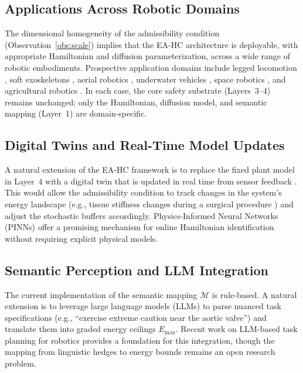\documentclass[11pt]{article}
\begin{document}
\subsection{Applications Across Robotic Domains}

The dimensional homogeneity of the admissibility condition (Observation~\ref{obs:scale})
implies that the EA-HC architecture is deployable, with appropriate Hamiltonian and diffusion
parameterization, across a wide range of robotic embodiments. Prospective application domains
include legged locomotion \cite{hutter2016}, soft exoskeletons \cite{menguc2013}, aerial
robotics \cite{faessler2018}, underwater vehicles \cite{fossen1994}, space robotics
\cite{flores2014}, and agricultural robotics \cite{bac2014}. In each case, the core safety
substrate (Layers~3--4) remains unchanged; only the Hamiltonian, diffusion model, and
semantic mapping (Layer~1) are domain-specific.

\subsection{Digital Twins and Real-Time Model Updates}

A natural extension of the EA-HC framework is to replace the fixed plant model in Layer~4
with a digital twin that is updated in real time from sensor feedback \cite{grieves2017,tao2019}.
This would allow the admissibility condition to track changes in the system's energy landscape
(e.g., tissue stiffness changes during a surgical procedure \cite{haddadin2017}) and adjust the
stochastic buffers accordingly. Physics-Informed Neural Networks (PINNs) \cite{raissi2019}
offer a promising mechanism for online Hamiltonian identification without requiring explicit
physical models.

\subsection{Semantic Perception and LLM Integration}
\label{sec:llm}

The current implementation of the semantic mapping $\mathcal{M}$ is rule-based. A natural
extension is to leverage large language models (LLMs) to parse nuanced task specifications
(e.g., ``exercise extreme caution near the aortic valve'') and translate them into graded
energy ceilings $E_{\max}$. Recent work on LLM-based task planning for robotics \cite{ahn2023}
provides a foundation for this integration, though the mapping from linguistic hedges to energy
bounds remains an open research problem.
\end{document}

